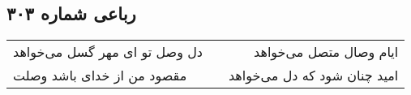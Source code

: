 \begin{center}
\section*{رباعی شماره ۳۰۳}
\label{sec:sh303}
\begin{longtable}{l p{0.5cm} r}
دل وصل تو ای مهر گسل می‌خواهد
&&
ایام وصال متصل می‌خواهد
\\
مقصود من از خدای باشد وصلت
&&
امید چنان شود که دل می‌خواهد
\\
\end{longtable}
\end{center}
